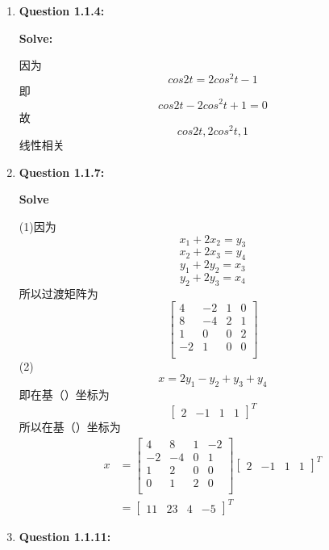 \documentclass[UTF8]{uofa-eng-assignment}
\begin{document}
\maketitle

\begin{enumerate}

\item \textbf{Question 1.1.4:}

\textbf{Solve:}

因为$$cos2t=2cos^2t-1$$
即$$cos2t-2cos^2t+1=0$$
故$$cos2t,2cos^2t,1$$线性相关
\item \textbf{Question 1.1.7:}

\textbf{Solve}


(1)因为$$x_1+2x_2=y_3$$
$$x_2+2x_3=y_4$$
$$y_1+2y_2=x_3$$
$$y_2+2y_3=x_4$$
所以过渡矩阵为
$$\left[
\begin{matrix}
    4&-2&1&0\\
    8&-4&2&1\\
    1&0&0&2\\
    -2&1&0&0\\
\end{matrix}\right]
$$
(2)
$$x=2y_1-y_2+y_3+y_4$$
即在基（\uppercase\expandafter{}）坐标为
$$\left[
\begin{matrix}
    2&-1&1&1
\end{matrix}\right]^T
$$
所以在基（\uppercase\expandafter{}）坐标为
$$
\begin{aligned}
x&=
\left[
\begin{matrix}
    4&8&1&-2\\
    -2&-4&0&1\\
    1&2&0&0\\
    0&1&2&0\\
\end{matrix}\right]
\left[
\begin{matrix}
    2&-1&1&1
\end{matrix}\right]^T\\
&=\left[
    \begin{matrix}
        11&23&4&-5
    \end{matrix}\right]^T
\end{aligned}
$$
\item \textbf{Question 1.1.11:}



\end{enumerate}
\end{document}
